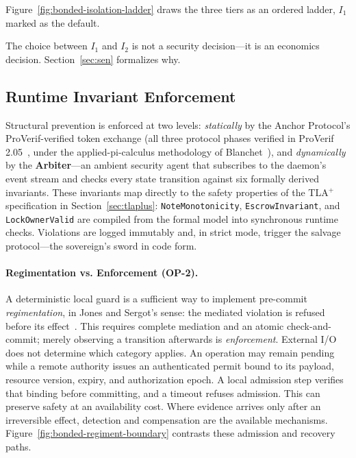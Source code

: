 \documentclass[11pt,a4paper]{article}
\theoremstyle{definition}
\theoremstyle{remark}
\begin{document}
Figure~\ref{fig:bonded-isolation-ladder} draws the three tiers as an ordered ladder, $I_1$ marked as the default.



The choice between $I_1$ and $I_2$ is not a security decision---it is an economics decision. Section~\ref{sec:sen} formalizes why.

\subsection{Runtime Invariant Enforcement}
Structural prevention is enforced at two levels: \emph{statically} by the Anchor Protocol's ProVerif-verified token exchange (all three protocol phases verified in ProVerif 2.05~, under the applied-pi-calculus methodology of Blanchet~), and \emph{dynamically} by the \textbf{Arbiter}---an ambient security agent that subscribes to the daemon's event stream and checks every state transition against six formally derived invariants. These invariants map directly to the safety properties of the TLA$^{+}$ specification in Section~\ref{sec:tlaplus}: \texttt{NoteMonotonicity}, \texttt{EscrowInvariant}, and \texttt{LockOwnerValid} are compiled from the formal model into synchronous runtime checks. Violations are logged immutably and, in strict mode, trigger the salvage protocol---the sovereign's sword in code form.

\paragraph{Regimentation vs. Enforcement (OP-2).}
A deterministic local guard is a sufficient way to implement
pre-commit \emph{regimentation}, in Jones and Sergot's sense: the mediated
violation is refused before its effect~.
This requires complete mediation and an atomic check-and-commit; merely
observing a transition afterwards is \emph{enforcement}.
External I/O does not determine which category applies. An operation may
remain pending while a remote authority issues an authenticated permit bound
to its payload, resource version, expiry, and authorization epoch. A local
admission step verifies that binding before committing, and a timeout refuses
admission. This can preserve safety at an availability cost. Where evidence
arrives only after an irreversible effect, detection and compensation are
the available mechanisms. Figure~\ref{fig:bonded-regiment-boundary} contrasts
these admission and recovery paths.
\end{document}
